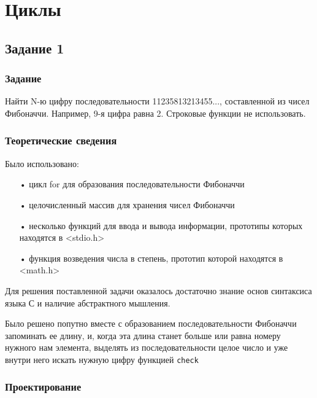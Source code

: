 \documentclass[12pt,a4paper]{report}
\begin{document}
\chapter{Циклы}
\section{Задание 1}
\subsection{Задание}

Найти N-ю цифру последовательности 11235813213455..., составленной из чисел Фибоначчи. Например, 9-я цифра равна 2. Строковые функции не использовать.

\subsection{Теоретические сведения}

Было использовано:
\begin{enumerate}
\item[•] цикл for для образования последовательности Фибоначчи
\item[•] целочисленный массив для хранения чисел Фибоначчи
\item[•] несколько функций для ввода и вывода информации, прототипы которых находятся в <stdio.h>
\item[•] функция возведения числа в степень, прототип которой находятся в <math.h>
\end{enumerate}

Для решения поставленной задачи оказалось достаточно знание основ синтаксиса языка С и наличие абстрактного мышления.

Было решено попутно вместе с образованием последовательности Фибоначчи запоминать ее длину, и, когда эта длина станет больше или равна номеру нужного нам элемента, выделять из последовательности целое число и уже внутри него искать нужную цифру функцией \verb-check-

\subsection{Проектирование}
\end{document}

